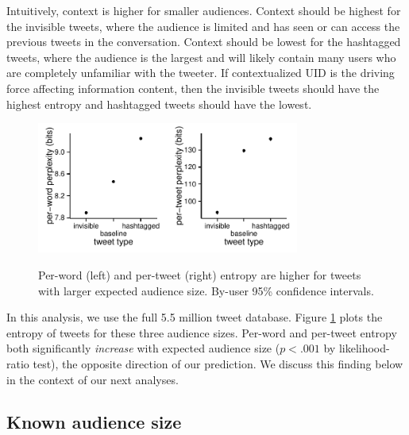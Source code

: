 \documentclass[11pt,letterpaper]{article}
\begin{document}
Intuitively, context is higher for smaller audiences. Context should be highest for the invisible tweets, where the audience is limited and has seen or can access the previous tweets in the conversation.  Context should be lowest for the hashtagged tweets, where the audience is the largest and will likely contain many users who are completely unfamiliar with the tweeter.  If contextualized UID is the driving force affecting information content, then the invisible tweets should have the highest entropy and hashtagged tweets should have the lowest.

\begin{figure}
 \centering \includegraphics[width=1.7in]{figures/cmcl-audience-pw.pdf}\includegraphics[width=1.7in]{figures/cmcl-audience-pt.pdf}
 \caption{\label{fig:audience} Per-word (left) and per-tweet (right) entropy are higher for tweets with larger expected audience size. By-user 95\% confidence intervals.}
\vspace*{-.5em}
\end{figure}

In this analysis, we use the full 5.5 million tweet database. Figure \ref{fig:audience} plots the entropy of tweets for these three audience sizes.  Per-word and per-tweet entropy both significantly {\it increase} with expected audience size ($p < .001$ by likelihood-ratio test), the opposite direction of our prediction. We discuss this finding below in the context of our next analyses. 


\subsection{Known audience size}
\end{document}
